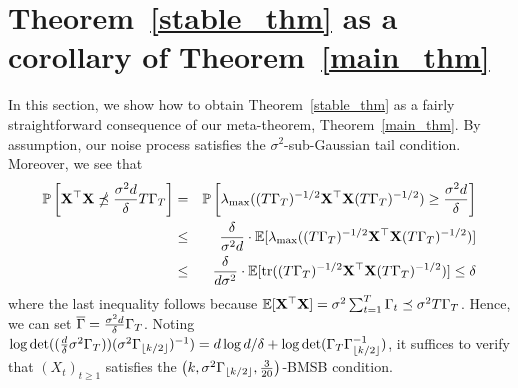 \section{Theorem~\ref{stable_thm} as a corollary of Theorem~\ref{main_thm}\label{sec:pf_stable_thm}}

In this section, we show how to obtain Theorem~\ref{stable_thm} as a fairly straightforward consequence of our meta-theorem, Theorem~\ref{main_thm}.
By assumption, our noise process satisfies the $\sigma^2$-sub-Gaussian tail condition. Moreover, we see that
\begin{eqnarray*}
\mathbb{P} \left[ \mathbf{X}^\top \mathbf{X} \npreceq \frac{\sigma^2 d}{\delta}T\Gamma_T \right] &=& \mathbb{P} \left[ \lambda_{\max}((T\Gamma_T)^{-1/2}\mathbf{X}^\top \mathbf{X} (T\Gamma_T)^{-1/2}) \ge \frac{\sigma^2 d}{\delta} \right] \\
&\le&  \frac{\delta}{\sigma^2 d} \cdot \mathbb{E}[\lambda_{\max}((T\Gamma_T)^{-1/2}\mathbf{X}^\top \mathbf{X} (T\Gamma_T)^{-1/2})]\\
&\le& \frac{\delta}{d\sigma^2} \cdot \mathbb{E}[\operatorname{tr}( (T\Gamma_T)^{-1/2}\mathbf{X}^\top \mathbf{X} (T\Gamma_T)^{-1/2})] \le \delta
\end{eqnarray*}
where the last inequality follows because $\mathbb{E}[\mathbf{X}^\top \mathbf{X}] = \sigma^2 \sum_{t=1}^T \Gamma_t \preceq \sigma^2 T\Gamma_T$. Hence, we can set $\overline{\Gamma} = \frac{\sigma^2 d}{\delta} \Gamma_T$. Noting $\log \det (  (\frac{d}{\delta}\sigma^2\Gamma_T))(\sigma^2 \Gamma_{\lfloor k/2\rfloor})^{-1}) = d\log d/\delta + \log \det (\Gamma_T \Gamma_{\lfloor k/2\rfloor}^{-1})$, it suffices to verify that $(X_t)_{t \ge 1}$ satisfies the $\left(k, \sigma^2 \Gamma_{\lfloor k/2\rfloor}, \frac{3}{20}\right)$-BMSB condition.

